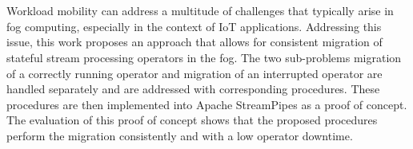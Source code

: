 \thispagestyle{empty}\section*{}
Workload mobility can address a multitude of challenges that typically arise in fog computing, especially in the context of IoT applications. Addressing this issue, this work proposes an approach that allows for consistent migration of stateful stream processing operators in the fog. The two sub-problems migration of a correctly running operator and migration of an interrupted operator are handled separately and are addressed with corresponding procedures. These procedures are then implemented into Apache StreamPipes as a proof of concept. The evaluation of this proof of concept shows that the proposed procedures perform the migration consistently and with a low operator downtime.



